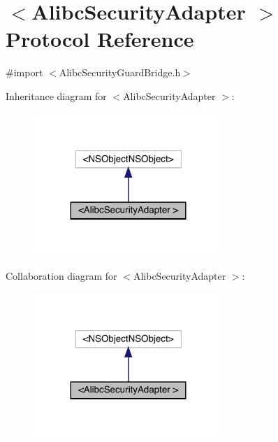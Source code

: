 \hypertarget{protocol_alibc_security_adapter_01-p}{}\section{$<$Alibc\+Security\+Adapter $>$ Protocol Reference}
\label{protocol_alibc_security_adapter_01-p}


{\ttfamily \#import $<$Alibc\+Security\+Guard\+Bridge.\+h$>$}



Inheritance diagram for $<$Alibc\+Security\+Adapter $>$\+:\nopagebreak
\begin{figure}[H]
\begin{center}
\leavevmode
\includegraphics[width=203pt]{protocol_alibc_security_adapter_01-p__inherit__graph}
\end{center}
\end{figure}


Collaboration diagram for $<$Alibc\+Security\+Adapter $>$\+:\nopagebreak
\begin{figure}[H]
\begin{center}
\leavevmode
\includegraphics[width=203pt]{protocol_alibc_security_adapter_01-p__coll__graph}
\end{center}
\end{figure}
